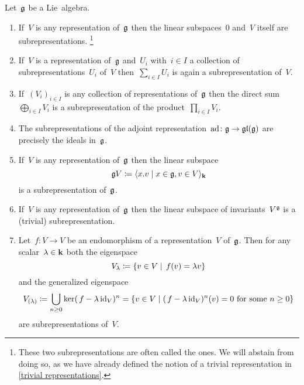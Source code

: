 \begin{examples}
  Let~$\mathfrak{g}$ be a Lie~algebra.
  \begin{enumerate}
    \item
      If~$V$ is any representation of~$\mathfrak{g}$ then the linear subspaces~$0$ and~$V$ itself are subrepresentations.%
    \footnote{These two subrepresentations are often called the  ones.
      We will abstain from doing so, as we have already defined the notion of a trivial representation in \cref{trivial representations}.}
    \item
      If~$V$ is a representation of~$\mathfrak{g}$ and~$U_i$ with~$i \in I$ a collection of subrepresentations~$U_i$ of~$V$ then~$\sum_{i \in I} U_i$ is again a subrepresentation of~$V$.
    \item
      If~$(V_i)_{i \in I}$ is any collection of representations of~$\mathfrak{g}$ then the direct sum~$\bigoplus_{i \in I} V_i$ is a subrepresentation of the product~$\prod_{i \in I} V_i$.
    \item
      The subrepresentations of the adjoint representation~$\operatorname{ad} \colon \mathfrak{g} \to \mathfrak{gl}(\mathfrak{g})$ are precisely the ideals in~$\mathfrak{g}$.
    \item
      If~$V$ is any representation of~$\mathfrak{g}$ then the linear subspace
      \[
        \glie V
        \defined
        \gen{
          x.v
          \suchthat
          x \in \glie,
          v \in V
        }_{\kf}
      \]
      is a subrepresentation of~$\mathfrak{g}$.
    \item
      If~$V$ is any representation of~$\mathfrak{g}$ then the linear subspace of invariants~$V^{\mathfrak{g}}$ is a (trivial) subrepresentation.
    \item
      Let~$f \colon V \to V$ be an endomorphism of a representation~$V$ of~$\mathfrak{g}$.
      Then for any scalar~$\lambda \in \mathbf{k}$ both the eigenspace
      \[
        V_\lambda
        \defined
        \{
          v \in V
        \suchthat
          \spacing
          f(v)
          =
          \lambda v
        \}
      \]
      and the generalized eigenspace
      \[
        V_{(\lambda)}
        \defined
        \bigcup_{n \geq 0} \ker(\spacing f - \lambda \id_V)^n
        =
        \{
          v \in V
        \suchthat
        \text{$(\spacing f - \lambda \id_V)^n(v) = 0$ for some~$n \geq 0$}
        \}
      \]
      are subrepresentations of~$V$.
  \end{enumerate}
\end{examples}


